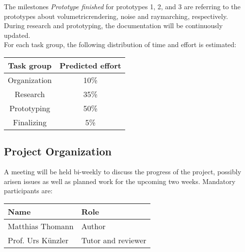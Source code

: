 \vspace{\baselineskip}
\begin{flushleft}
The milestones \emph{Prototype finished} for prototypes 1, 2, and 3 are referring to the prototypes about \gls{volumetricrendering}, \gls{noise} and \gls{raymarching}, respectively.
\\
\vspace{\baselineskip}
During research and prototyping, the documentation will be continuously updated.
\\
For each task group, the following distribution of time and effort is estimated:
\newline
\newline
\begin{tabular}{|c|c|}
    \hline
    \textbf{Task group}  & \textbf{Predicted effort}\\ \hline
    Organization        & 10\%                      \\ \hline
    Research            & 35\%                      \\ \hline
    Prototyping         & 50\%                      \\ \hline
    Finalizing          & 5\%                       \\ \hline
\end{tabular}
\end{flushleft} 


\clearpage
\subsection{Project Organization}
A meeting will be held bi-weekly to discuss the progress of the project, possibly arisen issues as well as planned work for the upcoming two weeks.
\vspace{\baselineskip}
\newline
\noindent Mandatory participants are:
\vspace{\baselineskip}
\newline
\noindent\begin{tabular}{|l|l|}
    \hline
    \textbf{Name}       & \textbf{Role}         \\ \hline
    Matthias Thomann    & Author                \\ \hline
    Prof. Urs Künzler   & Tutor and reviewer    \\ \hline
\end{tabular}

